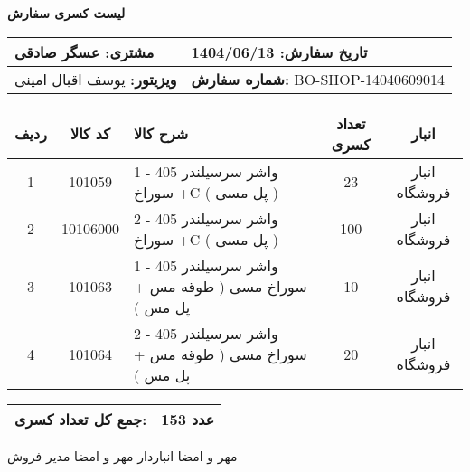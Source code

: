 \documentclass[a4paper,12pt]{article}
\begin{document}
\begin{center}
    {\Huge \textbf{   لیست کسری سفارش   }} \\
\end{center}

\vspace{0.5cm}

\noindent
\begin{tabular}{|p{7cm}|p{7cm}|}
\hline
\textbf{مشتری:} عسگر صادقی & \textbf{تاریخ سفارش:} 1404/06/13 \\
\hline
\textbf{ویزیتور:} یوسف اقبال امینی & \textbf{شماره سفارش:} BO-SHOP-14040609014 \\
\hline
\end{tabular}

\vspace{0.5cm}

\begin{longtable}{|c|c|p{6cm}|c|c|}
\hline
\rowcolor{headerblue} \color{white}
\textbf{ردیف} &  \textbf{کد کالا} & \textbf{شرح کالا} & \textbf{تعداد کسری} & \textbf{انبار} \\
\hline
\endhead
1 & 101059 & واشر سرسیلندر 405 - 1 سوراخ +C ( پل مسی ) & 23 & انبار فروشگاه \\
\hline
2 & 10106000 & واشر سرسیلندر 405 - 2 سوراخ +C ( پل مسی ) & 100 & انبار فروشگاه \\
\hline
3 & 101063 & واشر سرسیلندر 405 - 1 سوراخ مسی ( طوقه مس + پل مس ) & 10 & انبار فروشگاه \\
\hline
4 & 101064 & واشر سرسیلندر 405 - 2 سوراخ مسی ( طوقه مس + پل مس ) & 20 & انبار فروشگاه \\
\hline

\end{longtable}

\vspace{0.3cm}
\noindent
\begin{tabular}{|p{7cm}|p{7cm}|}
\hline
\textbf{جمع کل تعداد کسری:} & 153 عدد \\
\hline
\end{tabular}

\vspace{1.5cm}

\noindent
مهر و امضا انباردار \hspace{8cm} مهر و امضا مدیر فروش
\end{document}
